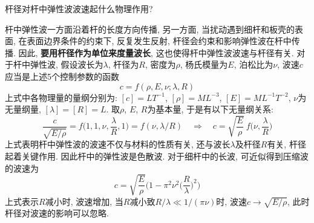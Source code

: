 \begin{problem}[24]
杆径对杆中弹性波波速起什么物理作用?
\end{problem}
\begin{solution}
杆中弹性波一方面沿着杆的长度方向传播, 另一方面, 当扰动遇到细杆和板壳的表面, 在表面边界条件的约束下, 反复发生反射, 杆径会约束和影响弹性波在杆中传播. 因此, \textbf{要用杆径作为单位来度量波长}, 这也使得杆中弹性波波速与杆径有关. 对于杆中弹性波, 假设波长为$\lambda$, 杆径为$R$, 密度为$\rho$, 杨氏模量为$E$, 泊松比为$\nu$, 波速$c$应当是上述5个控制参数的函数
\[
c = f(\rho, E, \nu; \lambda, R)
\]
上式中各物理量的量纲分别为: $[c]=LT^{-1}$, $[\rho]=ML^{-3}$, $[E]=ML^{-1}T^{-2}$, $\nu$为无量纲量, $[\lambda]=[R]=L$. 取$\rho$, $E$, $R$为基本量, 于是有以下无量纲关系:
\[
\frac{c}{\sqrt{E/\rho}} = f\bigg(1,1,\nu,\frac{\lambda}{R},1\bigg) = f(\nu, \lambda/R) 
\quad\Longrightarrow\quad
c = \sqrt{\frac{E}{\rho}}~f\bigg(\nu,\frac{\lambda}{R}\bigg)
\]
上式表明杆中弹性波的波速不仅与材料的性质有关, 还与波长$\lambda$及杆径$R$有关, 杆径起着关键作用. 因此杆中的弹性波是色散波. 对于细杆中的长波, 可近似得到压缩波的波速\cite{tan_dimensional_2011}为
\[
c = \sqrt{\frac{E}{\rho}} \bigg(1 - \pi^2 \nu^2 \Big(\frac{R}{\lambda}\Big)^2\bigg)
\]
上式表示$R$减小时, 波速增加, 当$R$减小致$R/\lambda\ll 1/(\pi\nu)$时, 波速$c\rightarrow \sqrt{E/\rho}$, 此时杆径对波速的影响可以忽略.
\end{solution}
